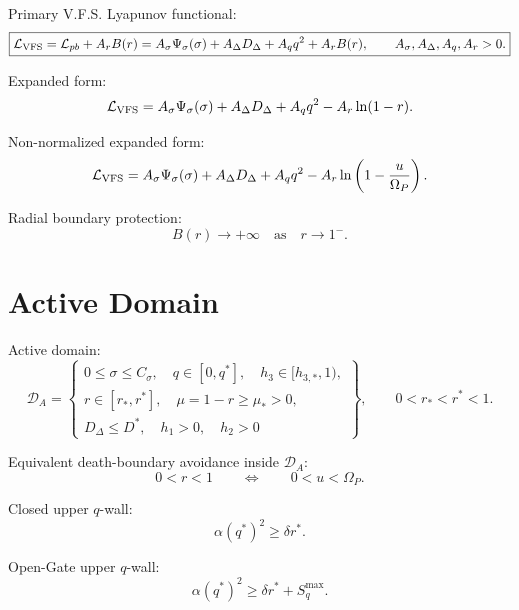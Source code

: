 \documentclass[11pt,a4paper]{article}
\newcommand{\DA}{\mathcal D_A}
\newcommand{\LV}{\mathcal L_{\rm VFS}}
\newcommand{\Om}{\Omega_P}
\theoremstyle{remark}
\begin{document}
Primary V.F.S. Lyapunov functional:
\begin{equation}
  \boxed{
  \LV=\mathcal L_{pb}+A_rB(r)
  =A_\sigma\Psi_\sigma(\sigma)+A_\Delta D_\Delta+A_q q^2+A_rB(r),
  \qquad
  A_\sigma,A_\Delta,A_q,A_r>0.}
\end{equation}

Expanded form:
\begin{equation}
  \LV=A_\sigma\Psi_\sigma(\sigma)+A_\Delta D_\Delta+A_q q^2
  -A_r\ln(1-r).
\end{equation}

Non-normalized expanded form:
\begin{equation}
  \LV=A_\sigma\Psi_\sigma(\sigma)+A_\Delta D_\Delta+A_q q^2
  -A_r\ln\left(1-\frac{u}{\Om}\right).
\end{equation}

Radial boundary protection:
\begin{equation}
  B(r)\to+\infty\quad\text{as}\quad r\to1^-.
\end{equation}

\section{Active Domain}

Active domain:
\begin{equation}
\DA=\left\{
\begin{array}{l}
0\le\sigma\le C_\sigma,\quad q\in[0,q^*],\quad h_3\in[h_{3,*},1),\\
r\in[r_*,r^*],\quad \mu=1-r\ge\mu_*>0,\\
D_\Delta\le D^*,\quad h_1>0,\quad h_2>0
\end{array}
\right\},
\qquad
0<r_*<r^*<1.
\end{equation}

Equivalent death-boundary avoidance inside $\DA$:
\begin{equation}
  0<r<1
  \qquad\Longleftrightarrow\qquad
  0<u<\Om.
\end{equation}

Closed upper $q$-wall:
\begin{equation}
  \alpha(q^*)^2\ge\delta r^*.
\end{equation}

Open-Gate upper $q$-wall:
\begin{equation}
  \boxed{\alpha(q^*)^2\ge \delta r^*+S_q^{\max}.}
\end{equation}
\end{document}
